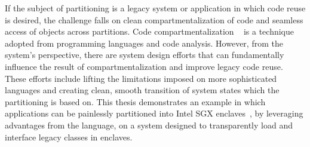 
If the subject of partitioning is a legacy system or application
in which code reuse is desired,
the challenge falls on
clean compartmentalization of code
and seamless access of objects across partitions.
Code compartmentalization
~\citep{addistant, jorchestra, jif-split, swift}
is a technique adopted from
programming languages and code analysis.
However, from the system's perspective,
there are system design efforts that
can fundamentally influence the result of compartmentalization
and improve legacy code reuse.
These efforts include
lifting the limitations imposed on more sophisticated languages
and creating clean, smooth transition of system states
which the partitioning is based on.
This thesis demonstrates an example
in which applications can be painlessly partitioned
into Intel SGX enclaves~\citep{intelsgx},
by leveraging advantages from the \java{} language,
on a system designed to transparently load and interface legacy \java{} classes in enclaves.


